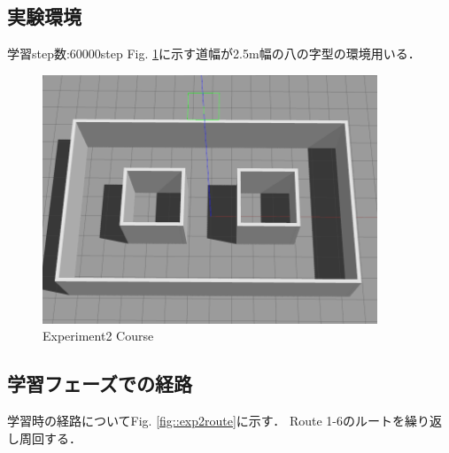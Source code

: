 \subsection{実験環境}
学習step数:60000step
Fig. \ref{fig::hatinozi}に示す道幅が2.5m幅の八の字型の環境用いる．
\begin{figure}[h]
    \centering
    \includegraphics[width = 10cm]{./figs/coli.png}
    \caption{Experiment2 Course}
    \label{fig::hatinozi}
\end{figure}

\newpage
\subsection{学習フェーズでの経路}
学習時の経路についてFig. \ref{fig::exp2route}に示す．
Route 1-6のルートを繰り返し周回する．

